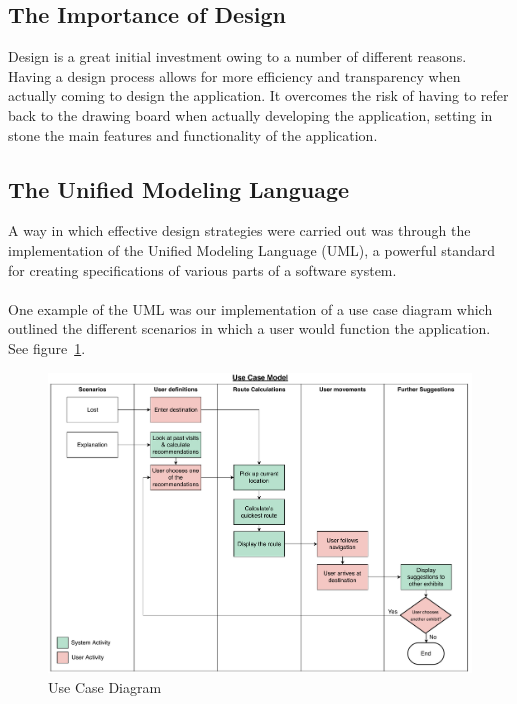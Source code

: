 \documentclass{article}
\author{Hamza Sheikh}
\begin{document}
\subsection{The Importance of Design}

Design is a great initial investment owing to a number of different reasons. Having a design process allows for more efficiency and transparency when actually coming to design the application. It overcomes the risk of having to refer back to the drawing board when actually developing the application, setting in stone the main features and functionality of the application.\\

\subsection{The Unified Modeling Language}

A way in which effective design strategies were carried out was through the implementation of the Unified Modeling Language (UML), a powerful standard for creating specifications of various parts of a software system.\\

\\One example of the UML was our implementation of a use case diagram which outlined the different scenarios in which a user would function the application. See figure~\ref{fig:Use Case Diagram}.\\

\begin{figure}[H]
    \centering
    \includegraphics[width=\textwidth]{use_case.pdf}
    \caption{Use Case Diagram}
    \label{fig:Use Case Diagram}
\end{figure}
\end{document}
